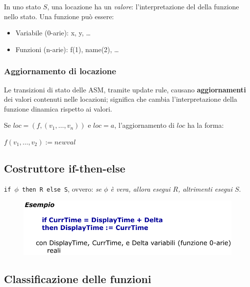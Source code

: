 \noindent In uno stato $S$, una locazione ha un \textit{valore}: l'interpretazione del 
della funzione nello stato. Una funzione può essere: 
\begin{itemize}
    \item Variabile (0-arie): x, y, \dots
    \item Funzioni (n-arie): f(1), name(2), \dots
\end{itemize}


\subsubsection{Aggiornamento di locazione}

Le transizioni di stato delle ASM, tramite update rule, causano \textbf{aggiornamenti}
dei valori contenuti nelle locazioni; significa che cambia l'interpretazione 
della funzione dinamica rispetto ai valori.

\noindent Se $loc = (f,(v_1, \dots, v_n))$ e $loc = a$, l'aggiornamento di $loc$ ha la forma:

$f(v_1, \dots, v_2) := newval$

\newpage
\subsection{Costruttore if-then-else}

\texttt{if $\phi$ then R else S}, ovvero: \textit{se $\phi$ è vera, allora esegui $R$, altrimenti
esegui $S$}.

\begin{figure}[H]
    \centering
    \includegraphics[width=0.8\linewidth]{chapters/1-asm/images/ex1.png}
\end{figure}

\subsection{Classificazione delle funzioni}

